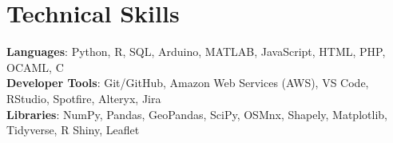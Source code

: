\documentclass[letterpaper,11pt]{article}
\begin{document}
%
\section{Technical Skills}
 \begin{itemize}[leftmargin=0.15in, label={}]
    \small{\item{
     \textbf{Languages}{: Python, R, SQL, Arduino, MATLAB, JavaScript, HTML, PHP, OCAML, C} \\
     \textbf{Developer Tools}{: Git/GitHub, Amazon Web Services (AWS), VS Code, RStudio, Spotfire, Alteryx, Jira} \\
     \textbf{Libraries}{: NumPy, Pandas, GeoPandas, SciPy, OSMnx, Shapely, Matplotlib, Tidyverse, R Shiny, Leaflet}
    }}
 \end{itemize}


\end{document}
